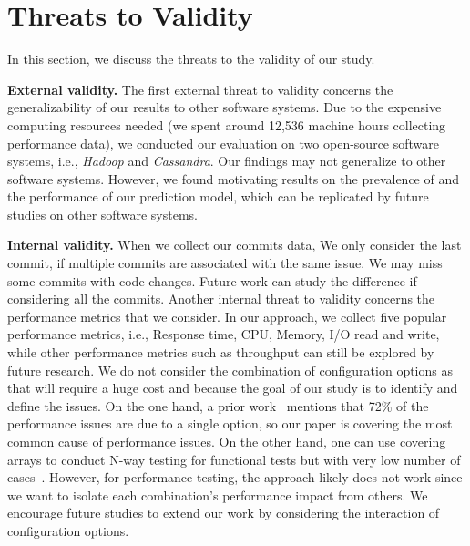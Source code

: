 
\section{Threats to Validity}
\label{sec:threats}
In this section, we discuss the threats to the validity of our study. 

\noindent \textbf{External validity.} The first external threat to validity concerns the generalizability of our results to other software systems. Due to the expensive computing resources needed (we spent around 12,536 machine hours collecting performance data), we conducted our evaluation on two open-source software systems, i.e., \emph{Hadoop} and \emph{Cassandra}. Our findings may not generalize to other software systems. %
However, we found motivating results on the prevalence of \inconsistent and the performance of our prediction model, which can be replicated by future studies on other software systems. %

\noindent \textbf{Internal validity.}
When we collect our commits data, We only consider the last commit, if multiple commits are associated with the same issue. We may miss some commits with code changes. Future work can study the difference if considering all the commits.
Another internal threat to validity concerns the performance metrics that we consider. In our approach, we collect five popular performance metrics, i.e., Response time, CPU, Memory, I/O read and write, while other performance metrics such as throughput can still be explored by future research.%
We do not consider the combination of configuration options as that will require a huge cost and because the goal of our study is to identify and define the \inconsistent issues. On the one hand, a prior work~\cite{RN2864} mentions that 72\% of the performance issues are due to a single option, so our paper is covering the most common cause of performance issues. On the other hand, one can use covering arrays to conduct N-way testing for functional tests but with very low number of cases~\cite{colbourn2004combinatorial}. However, for performance testing, the approach likely does not work since we want to isolate each combination's performance impact from others. We encourage future studies to extend our work by considering the interaction of configuration options.

